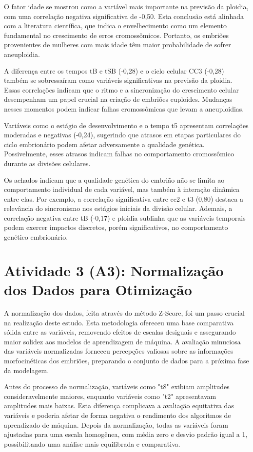 O fator idade se mostrou como a variável mais importante na previsão da ploidia, com uma correlação negativa significativa de -0,50. Esta conclusão está alinhada com a literatura científica, que indica o envelhecimento como um elemento fundamental no crescimento de erros cromossômicos. Portanto, os embriões provenientes de mulheres com mais idade têm maior probabilidade de sofrer aneuploidia.

A diferença entre os tempos tB e tSB (-0,28) e o ciclo celular CC3 (-0,28) também se sobressaíram como variáveis significativas na previsão da ploidia. Essas correlações indicam que o ritmo e a sincronização do crescimento celular desempenham um papel crucial na criação de embriões euploides. Mudanças nesses momentos podem indicar falhas cromossômicas que levam a aneuploidias.

Variáveis como o estágio de desenvolvimento e o tempo t5 apresentam correlações moderadas e negativas (-0,24), sugerindo que atrasos em etapas particulares do ciclo embrionário podem afetar adversamente a qualidade genética. Possivelmente, esses atrasos indicam falhas no comportamento cromossômico durante as divisões celulares.

Os achados indicam que a qualidade genética do embrião não se limita ao comportamento individual de cada variável, mas também à interação dinâmica entre elas. Por exemplo, a correlação significativa entre cc2 e t3 (0,80) destaca a relevância do sincronismo nos estágios iniciais da divisão celular. Ademais, a correlação negativa entre tB (-0,17) e ploidia sublinha que as variáveis temporais podem exercer impactos discretos, porém significativos, no comportamento genético embrionário.

\section{Atividade 3 (A3): Normalização dos Dados para Otimização}

A normalização dos dados, feita através do método Z-Score, foi um passo crucial na realização deste estudo. Esta metodologia ofereceu uma base comparativa sólida entre as variáveis, removendo efeitos de escalas desiguais e assegurando maior solidez aos modelos de aprendizagem de máquina. A avaliação minuciosa das variáveis normalizadas forneceu percepções valiosas sobre as informações morfocinéticas dos embriões, preparando o conjunto de dados para a próxima fase da modelagem.

Antes do processo de normalização, variáveis como "t8" exibiam amplitudes consideravelmente maiores, enquanto variáveis como "t2" apresentavam amplitudes mais baixas. Esta diferença complicava a avaliação equitativa das variáveis e poderia afetar de forma negativa o rendimento dos algoritmos de aprendizado de máquina. Depois da normalização, todas as variáveis foram ajustadas para uma escala homogênea, com média zero e desvio padrão igual a 1, possibilitando uma análise mais equilibrada e comparativa.

